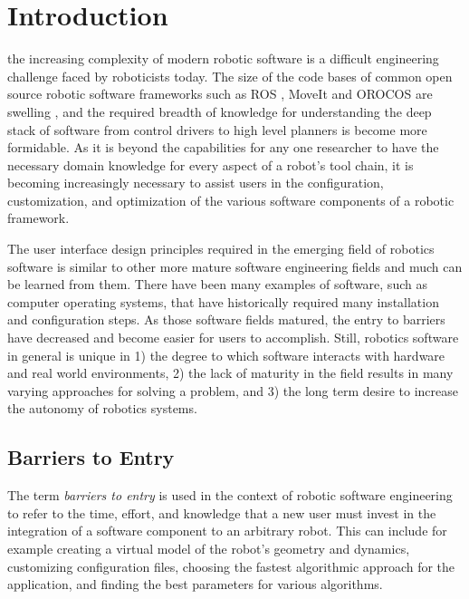 \documentclass[10pt,journal,compsoc]{joser1}
\begin{document}
\section{Introduction}
 {the increasing complexity of modern robotic software is a difficult engineering challenge faced by roboticists today. The size of the code bases of common open source robotic software frameworks such as ROS \cite{quigley2009ros}, MoveIt \cite{moveit} and OROCOS \cite{bruyninckx2001open} are swelling \cite{makarenko2007benefits}, and the required breadth of knowledge for understanding the deep stack of software from control drivers to high level planners is become more formidable. As it is beyond the capabilities for any one researcher to have the necessary domain knowledge for every aspect of a robot's tool chain, it is becoming increasingly necessary to assist users in the configuration, customization, and optimization of the various software components of a robotic framework. 

The user interface design principles required in the emerging field of robotics software is similar to other more mature software engineering fields and much can be learned from them. There have been many examples of software, such as computer operating systems, that have historically required many installation and configuration steps. As those software fields matured, the entry to barriers have decreased and become easier for users to accomplish. Still, robotics software in general is unique in 1) the degree to which software interacts with hardware and real world environments, 2) the lack of maturity in the field results in many varying approaches for solving a problem, and 3) the long term desire to increase the autonomy of robotics systems. 

\subsection{Barriers to Entry}

The term \textit{barriers to entry} is used in the context of robotic software engineering to refer to the time, effort, and knowledge that a new user must invest in the integration of a software component to an arbitrary robot. This can include for example creating a virtual model of the robot's geometry and dynamics, customizing configuration files, choosing the fastest algorithmic approach for the application, and finding the best parameters for various algorithms. 

}
\end{document}
